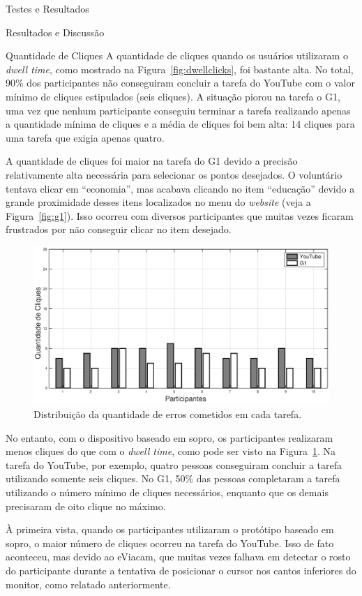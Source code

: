 \begin{chapter}{Testes e Resultados}
\begin{section}{Resultados e Discussão}
\begin{subsection}{Quantidade de Cliques}
A quantidade de cliques quando os usuários utilizaram o \textit{dwell
time}, como mostrado na Figura~\ref{fig:dwellclicks}, foi bastante alta. No
total, 90\% dos participantes não conseguiram concluir a tarefa do YouTube com o
valor mínimo de cliques estipulados (seis cliques). A situação piorou na tarefa
o G1, uma vez que nenhum participante conseguiu terminar a tarefa realizando
apenas a quantidade mínima de cliques e a média de cliques foi bem alta: 14
cliques para uma tarefa que exigia apenas quatro.

A quantidade de cliques foi maior na tarefa do G1 devido a precisão
relativamente alta necessária para selecionar os pontos desejados. O voluntário
tentava clicar em ``economia'', mas acabava clicando no item ``educação'' devido
a grande proximidade desses itens localizados no menu do \textit{website}
(veja a Figura~\ref{fig:g1}). Isso ocorreu com diversos participantes que muitas
vezes ficaram frustrados por não conseguir clicar no item desejado.

\begin{figure}[!h]
	\centering
	\includegraphics[width=1.00\linewidth]{fig/PuffClicks}
	\caption{Distribuição da quantidade de erros cometidos em cada tarefa.}
	\label{fig:puffclicks}
\end{figure}

No entanto, com o dispositivo baseado em sopro, os participantes realizaram
menos cliques do que com o \textit{dwell time}, como pode ser visto na
Figura~\ref{fig:puffclicks}. Na tarefa do YouTube, por exemplo, quatro pessoas
conseguiram concluir a tarefa utilizando somente seis cliques. No G1, 50\% das
pessoas completaram a tarefa utilizando o número mínimo de cliques necessários,
enquanto que os demais precisaram de oito clique no máximo.

À primeira vista, quando os participantes utilizaram o protótipo baseado em
sopro, o maior número de cliques ocorreu na tarefa do YouTube. Isso de fato
aconteceu, mas devido ao eViacam, que muitas vezes falhava em detectar o rosto
do participante durante a tentativa de posicionar o cursor nos cantos inferiores
do monitor, como relatado anteriormente.
  

\end{subsection}
\end{section}
\end{chapter}
